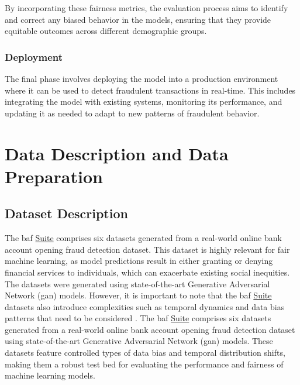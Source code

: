 \documentclass[12pt,a4paper]{report}
\begin{document}
By incorporating these fairness metrics, the evaluation process aims to identify and correct any biased behavior in the models, ensuring that they provide equitable outcomes across different demographic groups.\\




\subsection{Deployment}
The final phase involves deploying the model into a production environment where it can be used to detect fraudulent transactions in real-time. This includes integrating the model with existing systems, monitoring its performance, and updating it as needed to adapt to new patterns of fraudulent behavior.







\clearpage










\chapter{Data Description and Data Preparation}
\section{Dataset Description}
The \acrshort{baf} \href{https://www.kaggle.com/datasets/sgpjesus/bank-account-fraud-dataset-neurips-2022/code}{Suite} comprises six datasets generated from a real-world online bank account opening fraud detection dataset. This dataset is highly relevant for fair machine learning, as model predictions result in either granting or denying financial services to individuals, which can exacerbate existing social inequities. The datasets were generated using state-of-the-art Generative Adversarial Network (\acrshort{gan}) models. However, it is important to note that the \acrshort{baf} \href{https://www.kaggle.com/datasets/sgpjesus/bank-account-fraud-dataset-neurips-2022/code}{Suite} datasets also introduce complexities such as temporal dynamics and data bias patterns that need to be considered \citep{jesus2022turning}. The \acrshort{baf} \href{https://www.kaggle.com/datasets/sgpjesus/bank-account-fraud-dataset-neurips-2022/code}{Suite} comprises six datasets generated from a real-world online bank account opening fraud detection dataset using state-of-the-art Generative Adversarial Network (\acrshort{gan}) models. These datasets feature controlled types of data bias and temporal distribution shifts, making them a robust test bed for evaluating the performance and fairness of machine learning models.\\
\end{document}
